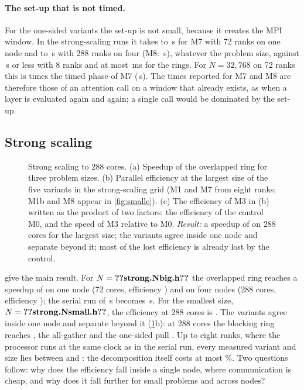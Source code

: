 \paragraph{The set-up that is not timed.} For the one-sided variants the set-up
is not small, because it creates the MPI window. In the strong-scaling runs it
takes  to \,s for M7 with 72
ranks on one node and  to \,s
with 288 ranks on four (M8: \,s), whatever the problem size,
against \,s or less with 8 ranks and at most
\,ms for the rings. For $N=32{,}768$ on 72 ranks this is
 times the timed phase of M7
(\,s). The times reported for M7 and M8 are
therefore those of an attention call on a window that already exists, as when a
layer is evaluated again and again; a single call would be dominated by the
set-up.

\subsection{Strong scaling}

\begin{figure}[t]
\centering
{}
\caption{Strong scaling to 288 cores. (a) Speedup of the overlapped ring for three
problem sizes. (b) Parallel efficiency at the largest size of the five variants in
the strong-scaling grid (M1 and M7 from eight ranks; M1b and M8 appear in
\cref{fig:smallc}). (c) The efficiency of M3 in (b) written as the product of two
factors: the efficiency of the control M0, and the speed of M3 relative to M0.
\emph{Result:} a speedup of  on 288 cores for the largest size; the
variants agree inside one node and separate beyond it; most of the lost efficiency
is already lost by the control.}
\label{fig:strong}
\end{figure}

 give the main result. For $N=\n{strong.Nbig.h}$ the
overlapped ring reaches a speedup of  on one node (72 cores,
efficiency ) and  on four nodes (288 cores,
efficiency ); the serial run of \,s becomes
\,s. For the smallest size, $N=\n{strong.Nsmall.h}$, the
efficiency at 288 cores is . The variants agree inside one
node and separate beyond it (\cref{fig:strong}b): at 288 cores the blocking ring
reaches , the all-gather  and
the one-sided pull . Up to eight ranks, where the
processor runs at the same clock as in the serial run, every measured variant and
size lies between  and : the decomposition
itself costs at most \%. Two questions follow: why does the
efficiency fall inside a single node, where communication is cheap, and why does it
fall further for small problems and across nodes?

